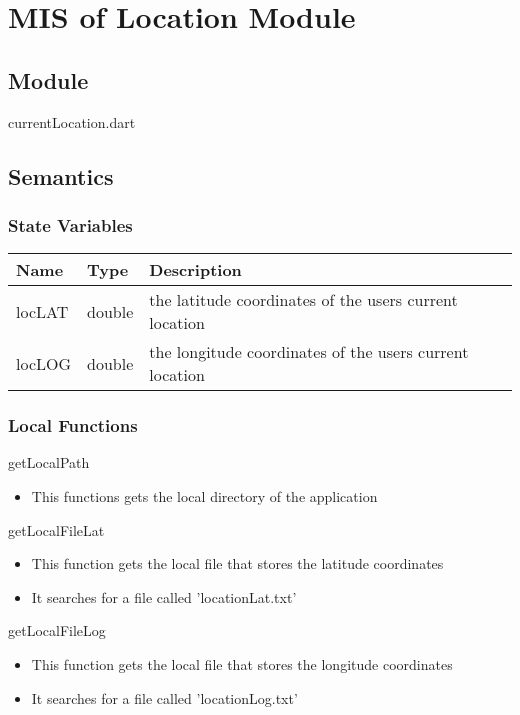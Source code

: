 \documentclass[12pt, titlepage]{article}
\begin{document}

\section{MIS of Location Module} \label{mHD}

\subsection{Module}
currentLocation.dart

\subsection{Semantics}

\subsubsection{State Variables}

\begin{center}
\begin{tabular}{p{4cm} p{4cm} p{6cm}}
\hline
\textbf{Name} & \textbf{Type} & \textbf{Description} \\
\hline
locLAT & double & the latitude coordinates of the users current location \\
locLOG & double & the longitude coordinates of the users current location \\
\hline
\end{tabular}
\end{center}

\subsubsection{Local Functions}

\noindent getLocalPath
\begin{itemize}
\item This functions gets the local directory of the application
\end{itemize}

\noindent getLocalFileLat
\begin{itemize}
\item This function gets the local file that stores the latitude coordinates
\item It searches for a file called 'locationLat.txt'
\end{itemize}

\noindent getLocalFileLog
\begin{itemize}
\item This function gets the local file that stores the longitude coordinates
\item It searches for a file called 'locationLog.txt'
\end{itemize}
\end{document}
